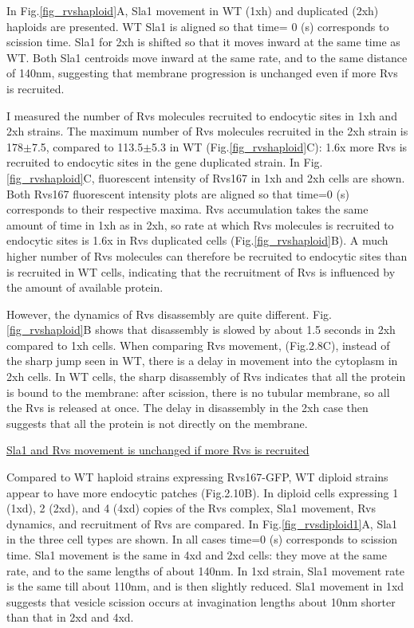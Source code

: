 In Fig.\ref{fig_rvshaploid}A, Sla1 movement in WT (1xh) and duplicated (2xh) haploids are presented. WT Sla1 is aligned so that time= 0 (s) corresponds to scission time. Sla1 for 2xh is shifted so that it moves inward at the same time as WT. Both Sla1 centroids move inward at the same rate, and to the same distance of 140nm, suggesting that membrane progression is unchanged even if more Rvs is recruited. 

I measured the number of Rvs molecules recruited to endocytic sites in 1xh and 2xh strains. The maximum number of Rvs molecules recruited in the 2xh strain is 178$\pm$7.5, compared to 113.5$\pm$5.3 in WT (Fig.\ref{fig_rvshaploid}C): 1.6x more Rvs is recruited to endocytic sites in the gene duplicated strain. In Fig.\ref{fig_rvshaploid}C, fluorescent intensity of Rvs167 in 1xh and 2xh cells are shown. Both Rvs167 fluorescent intensity plots are aligned so that time=0 (s) corresponds to their respective maxima. Rvs accumulation takes the same amount of time in 1xh as in 2xh, so rate at which Rvs molecules is recruited to endocytic sites is 1.6x in Rvs duplicated cells (Fig.\ref{fig_rvshaploid}B). A much higher number of Rvs molecules can therefore be recruited to endocytic sites than is recruited in  WT cells, indicating that the recruitment of Rvs is influenced by the amount of available protein.

However, the dynamics of Rvs disassembly are quite different. Fig.\ref{fig_rvshaploid}B shows that disassembly is slowed by about 1.5 seconds in 2xh compared to 1xh cells. When comparing Rvs movement, (Fig.2.8C), instead of the sharp jump seen in WT, there is a delay in movement into the cytoplasm in 2xh cells. In WT cells, the sharp disassembly of Rvs indicates that all the protein is bound to the membrane: after scission, there is no tubular membrane, so all the Rvs is released at once. The delay in disassembly in the 2xh case then suggests that all the protein is not directly on the membrane. 
	\vspace{5mm}

		

		
\underline{Sla1 and Rvs movement is unchanged if more Rvs is recruited}
		\label{sub_rvsdiploids}
		
Compared to WT haploid strains expressing Rvs167-GFP, WT diploid strains appear to have more endocytic patches (Fig.2.10B). 
In diploid cells expressing 1 (1xd), 2 (2xd), and 4 (4xd) copies of the Rvs complex, Sla1 movement, Rvs dynamics, and recruitment of Rvs are compared. 
In Fig.\ref{fig_rvsdiploid1}A, Sla1 in the three cell types are shown. In all cases time=0 (s) corresponds to scission time. Sla1 movement is the same in 4xd and 2xd cells: they move at the same rate, and to the same lengths of about 140nm. In 1xd strain, Sla1 movement rate is the same till about 110nm, and is then slightly reduced. Sla1 movement in 1xd suggests that vesicle scission occurs at invagination lengths about 10nm shorter than that in 2xd and 4xd. 

